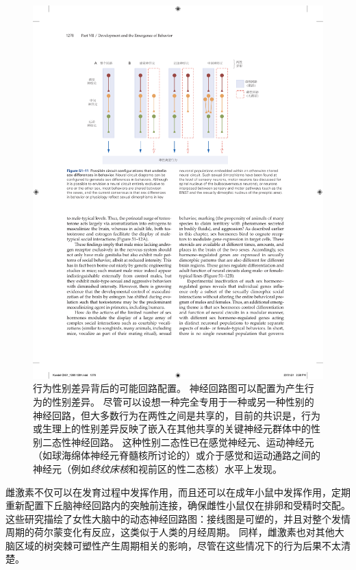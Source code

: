\begin{figure}[htbp]
	\centering
	\includegraphics[width=1.0\linewidth]{chap51/fig_51_11}
	\caption{行为性别差异背后的可能回路配置。
		神经回路图可以配置为产生行为的性别差异。
		尽管可以设想一种完全专用于一种或另一种性别的神经回路，但大多数行为在两性之间是共享的，目前的共识是，行为或生理上的性别差异反映了嵌入在其他共享的关键神经元群体中的性别二态性神经回路。
		这种性别二态性已在感觉神经元、运动神经元（如球海绵体神经元脊髓核所讨论的）或介于感觉和运动通路之间的神经元（例如\textit{终纹床核}和视前区的性二态核）水平上发现。}
	\label{fig:51_11}
\end{figure}


雌激素不仅可以在发育过程中发挥作用，而且还可以在成年小鼠中发挥作用，定期重新配置下丘脑神经回路内的突触前连接，确保雌性小鼠仅在排卵和受精时交配。
这些研究描绘了女性大脑中的动态神经回路图：接线图是可塑的，并且对整个发情周期的荷尔蒙变化有反应，这类似于人类的月经周期。
同样，雌激素也对其他大脑区域的树突棘可塑性产生周期相关的影响，尽管在这些情况下的行为后果不太清楚。



